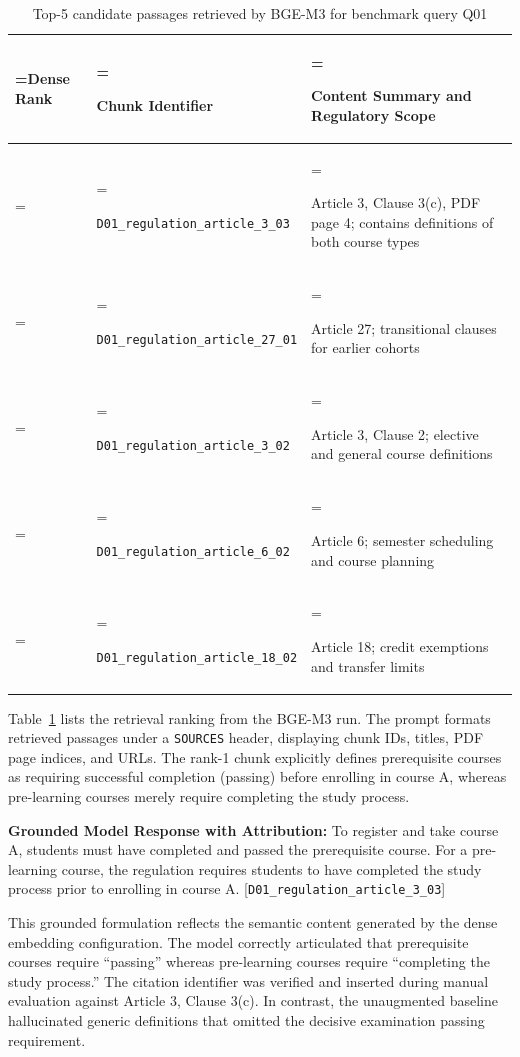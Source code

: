 \documentclass[12pt,a4paper]{article}
\newcommand{\chunkid}[1]{{\footnotesize\nolinkurl{#1}}}
\begin{document}
\begin{table}[H]
\centering
\caption{Top-5 candidate passages retrieved by BGE-M3 for benchmark query Q01}
\label{tab:3}
\footnotesize
\begin{tabularx}{\textwidth}{>{\hsize=0.32\hsize\linewidth=\hsize\centering\arraybackslash}X>{\hsize=1.28\hsize\linewidth=\hsize\raggedright\arraybackslash}X>{\hsize=1.40\hsize\linewidth=\hsize\raggedright\arraybackslash}X}
\toprule
\textbf{Dense Rank} & \textbf{Chunk Identifier} & \textbf{Content Summary and Regulatory Scope} \\
\midrule
1 & \chunkid{D01_regulation_article_3_03} & Article 3, Clause 3(c), PDF page 4; contains definitions of both course types \\
2 & \chunkid{D01_regulation_article_27_01} & Article 27; transitional clauses for earlier cohorts \\
3 & \chunkid{D01_regulation_article_3_02} & Article 3, Clause 2; elective and general course definitions \\
4 & \chunkid{D01_regulation_article_6_02} & Article 6; semester scheduling and course planning \\
5 & \chunkid{D01_regulation_article_18_02} & Article 18; credit exemptions and transfer limits \\
\bottomrule
\end{tabularx}
\end{table}

Table~\ref{tab:3} lists the retrieval ranking from the BGE-M3 run. The prompt formats retrieved passages under a \texttt{SOURCES} header, displaying chunk IDs, titles, PDF page indices, and URLs. The rank-1 chunk explicitly defines prerequisite courses as requiring successful completion (passing) before enrolling in course A, whereas pre-learning courses merely require completing the study process.

\textbf{Grounded Model Response with Attribution:} To register and take course A, students must have completed and passed the prerequisite course. For a pre-learning course, the regulation requires students to have completed the study process prior to enrolling in course A. [\chunkid{D01_regulation_article_3_03}] \cite{ref7}

This grounded formulation reflects the semantic content generated by the dense embedding configuration. The model correctly articulated that prerequisite courses require ``passing'' whereas pre-learning courses require ``completing the study process.'' The citation identifier was verified and inserted during manual evaluation against Article 3, Clause 3(c). In contrast, the unaugmented baseline hallucinated generic definitions that omitted the decisive examination passing requirement.
\end{document}
